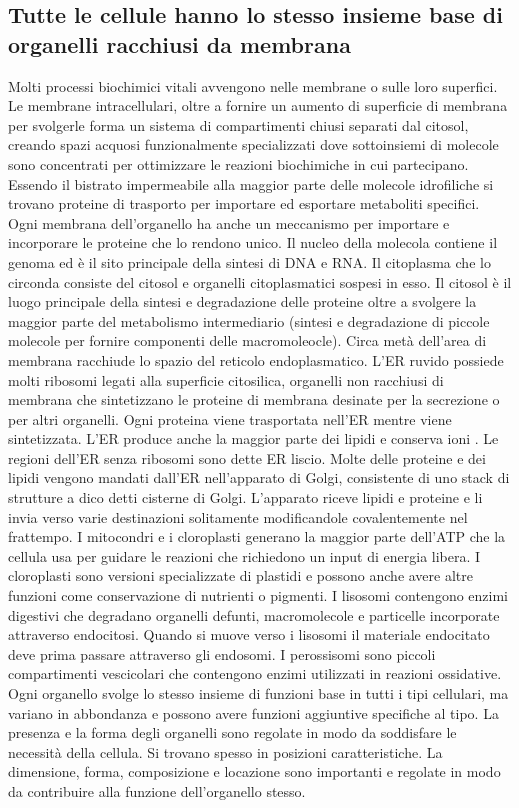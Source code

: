\subsection{Tutte le cellule hanno lo stesso insieme base di organelli racchiusi da membrana}
Molti processi biochimici vitali avvengono nelle membrane o sulle loro superfici. Le membrane intracellulari, oltre a fornire un aumento di superficie di membrana per svolgerle forma
un sistema di compartimenti chiusi separati dal citosol, creando spazi acquosi funzionalmente specializzati dove sottoinsiemi di molecole sono concentrati per ottimizzare le reazioni
biochimiche in cui partecipano. Essendo il bistrato impermeabile alla maggior parte delle molecole idrofiliche si trovano proteine di trasporto per importare ed esportare metaboliti
specifici. Ogni membrana dell'organello ha anche un meccanismo per importare e incorporare le proteine che lo rendono unico. Il nucleo della molecola contiene il genoma ed \`e il sito
principale della sintesi di DNA e RNA. Il citoplasma che lo circonda consiste del citosol e organelli citoplasmatici sospesi in esso. Il citosol \`e il luogo principale della sintesi
e degradazione delle proteine oltre a svolgere la maggior parte del metabolismo intermediario (sintesi e degradazione di piccole molecole per fornire componenti delle macromoleocle). 
Circa met\`a dell'area di membrana racchiude lo spazio del reticolo endoplasmatico. L'ER ruvido possiede molti ribosomi legati alla superficie citosilica, organelli non racchiusi di 
membrana che sintetizzano le proteine di membrana desinate per la secrezione o per altri organelli. Ogni proteina viene trasportata nell'ER mentre viene sintetizzata. L'ER produce anche
la maggior parte dei lipidi e conserva ioni . Le regioni dell'ER senza ribosomi sono dette ER liscio. Molte delle proteine e dei lipidi vengono mandati dall'ER nell'apparato
di Golgi, consistente di uno stack di strutture a dico detti cisterne di Golgi. L'apparato riceve lipidi e proteine e li invia verso varie destinazioni solitamente modificandole 
covalentemente nel frattempo. I mitocondri e i cloroplasti generano la maggior parte dell'ATP che la cellula usa per guidare le reazioni che richiedono un input di energia libera. I 
cloroplasti sono versioni specializzate di plastidi e possono anche avere altre funzioni come conservazione di nutrienti o pigmenti. I lisosomi contengono enzimi digestivi che degradano
organelli defunti, macromolecole e particelle incorporate attraverso endocitosi. Quando si muove verso i lisosomi il materiale endocitato deve prima passare attraverso gli endosomi. 
I perossisomi sono piccoli compartimenti vescicolari che contengono enzimi utilizzati in reazioni ossidative. Ogni organello svolge lo stesso insieme di funzioni base in tutti i tipi
cellulari, ma variano in abbondanza e possono avere funzioni aggiuntive specifiche al tipo. La presenza e la forma degli organelli sono regolate in modo da soddisfare le necessit\`a 
della cellula. Si trovano spesso in posizioni caratteristiche. La dimensione, forma, composizione e locazione sono importanti e regolate in modo da contribuire alla funzione 
dell'organello stesso.
